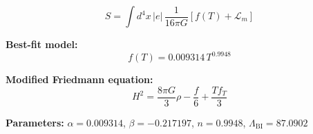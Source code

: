 
\begin{equation}
  S = \int d^4x \, |e| \, \frac{1}{16\pi G} \left[ f(T) + \mathcal{L}_m \right]
\end{equation}

\textbf{Best-fit model:}
\begin{equation}
  f(T) = 0.009314 \, T^{0.9948}
\end{equation}

\textbf{Modified Friedmann equation:}
\begin{equation}
  H^2 = \frac{8\pi G}{3} \rho - \frac{f}{6} + \frac{T f_T}{3}
\end{equation}

\textbf{Parameters:}
$\alpha = 0.009314$, \quad
$\beta = -0.217197$, \quad
$n = 0.9948$, \quad
$\Lambda_{\text{BI}} = 87.0902$
